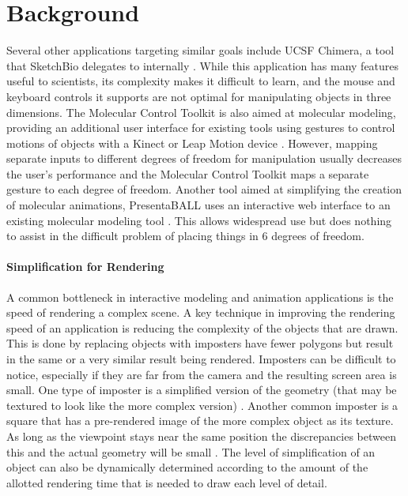 \documentclass{article} %
\begin{document}
\section{Background}
Several other applications targeting similar goals include UCSF Chimera, a tool that SketchBio delegates to internally \cite{pettersen2004ucsf}.  While this application has many features useful to scientists, its complexity makes it difficult to learn, and the mouse and keyboard controls it supports are not optimal for manipulating objects in three dimensions.  The Molecular Control Toolkit is also aimed at molecular modeling, providing an additional user interface for existing tools using gestures to control motions of objects with a Kinect or Leap Motion device \cite{sabirmolecular}.  However, mapping separate inputs to different degrees of freedom for manipulation usually decreases the user's performance\cite{bowman20043d} and the Molecular Control Toolkit maps a separate gesture to each degree of freedom.  Another tool aimed at simplifying the creation of molecular animations, PresentaBALL uses an interactive web interface to an existing molecular modeling tool \cite{nickelspresentaball}.  This allows widespread use but does nothing to assist in the difficult problem of placing things in 6 degrees of freedom.

\paragraph{Simplification for Rendering}
A common bottleneck in interactive modeling and animation applications is the speed of rendering a complex scene.  A key technique in improving the rendering speed of an application is reducing the complexity of the objects that are drawn.  This is done by replacing objects with imposters have fewer polygons but result in the same or a very similar result being rendered.  Imposters can be difficult to notice, especially if they are far from the camera and the resulting screen area is small.  One type of imposter is a simplified version of the geometry (that may be textured to look like the more complex version) \cite{decoret2003billboard}\cite{erikson1998simplification}\cite{cohen1998appearance}\cite{luebke2001developer}.  Another common imposter is a square that has a pre-rendered image of the more complex object as its texture.  As long as the viewpoint stays near the same position the discrepancies between this and the actual geometry will be small \cite{aliaga1996visualization}\cite{maciel1995visual}.  The level of simplification of an object can also be dynamically determined according to the amount of the allotted rendering time that is needed to draw each level of detail\cite{luebke1997view}.
\end{document}
